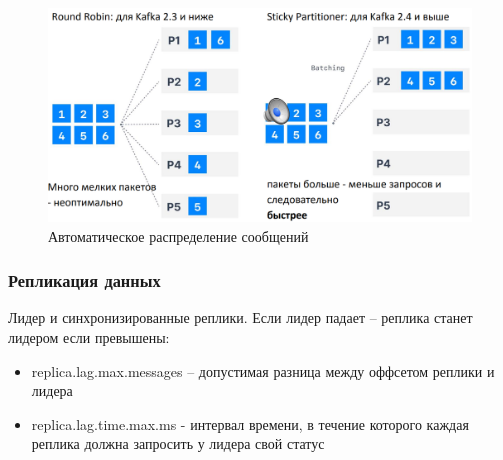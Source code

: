 \begin{figure}[ht]
	\centering
	\begin{minipage}[b]{0.65\textwidth}
		\includegraphics[width=\textwidth]{images/part.png}
        \caption{Автоматическое распределение сообщений}
	\end{minipage}
\end{figure}


\subsubsection*{Репликация данных}


Лидер и синхронизированные реплики.
Если лидер падает – реплика станет лидером если превышены:
\begin{itemize}
    \item replica.lag.max.messages – допустимая разница между оффсетом реплики и 
    лидера
    \item replica.lag.time.max.ms - интервал времени, в течение которого каждая реплика 
    должна запросить у лидера свой статус
\end{itemize}


